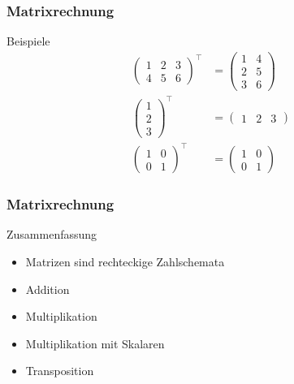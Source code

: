 \documentclass{beamer}
\newcommand{\trans}{\top}
\newcommand{\mytitle}{Matrixrechnung}
\begin{document}
\begin{frame}\frametitle{\mytitle}
	\begin{block}{Beispiele}
		\begin{align*}
			\begin{pmatrix} 1&2&3\\4&5&6 \end{pmatrix}^\trans&=
			\begin{pmatrix} 1&4\\2&5\\3&6 \end{pmatrix}\\
			\begin{pmatrix} 1\\2\\3 \end{pmatrix}^\trans&=\begin{pmatrix} 1&2&3\end{pmatrix}\\
			\begin{pmatrix} 1&0\\0&1 \end{pmatrix}^\trans&=\begin{pmatrix} 1&0\\0&1 \end{pmatrix}
		\end{align*}
	\end{block}
\end{frame}

\begin{frame}\frametitle{\mytitle}
	\begin{block}{Zusammenfassung}
		\begin{itemize}
			\item Matrizen sind rechteckige Zahlschemata
			\item Addition\item Multiplikation\item Multiplikation mit Skalaren
			\item Transposition
		\end{itemize}
	\end{block}
\end{frame}
\end{document}
